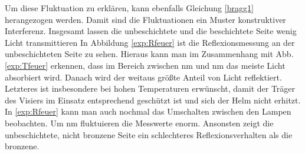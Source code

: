         Um diese Fluktuation zu erklären, kann ebenfalls Gleichung \ref{bragg1} herangezogen werden. Damit sind die Fluktuationen ein Muster konstruktiver Interferenz. Insgesamt lassen die unbeschichtete und die beschichtete Seite wenig Licht transmittieren
        In Abbildung \ref{exp:Rfeuer} ist die Reflexionsmessung an der unbeschichteten Seite zu sehen. Hieraus kann man im Zusammenhang mit Abb. \ref{exp:Tfeuer} erkennen, dass im Bereich zwischen \unit[350]{nm} und \unit[550]{nm} das meiste Licht absorbiert wird. Danach wird der weitaus größte Anteil von Licht reflektiert. Letzteres ist insbesondere bei hohen Temperaturen erwünscht, damit der Träger des Visiers im Einsatz entsprechend geschützt ist und sich der Helm nicht erhitzt. In \ref{exp:Rfeuer} kann man auch nochmal das Umschalten zwischen den Lampen beobachten. Um \unit[885]{nm} fluktuieren die Messwerte enorm. Ansonsten zeigt die unbeschichtete, nicht bronzene Seite ein schlechteres Reflexionsverhalten als die bronzene.
